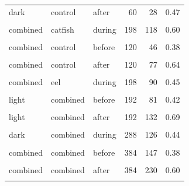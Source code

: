 \documentclass[
  12pt,
  a4paper,
  oneside]{scrbook}
\begin{document}
\begin{longtable}[t]{lllrrr}
dark & control & after & 60 & 28 & 0.47\\
\cellcolor{gray!8}{combined} & \cellcolor{gray!8}{catfish} & \cellcolor{gray!8}{before} & \cellcolor{gray!8}{132} & \cellcolor{gray!8}{60} & \cellcolor{gray!8}{0.45}\\
combined & catfish & during & 198 & 118 & 0.60\\
\addlinespace
\cellcolor{gray!8}{combined} & \cellcolor{gray!8}{catfish} & \cellcolor{gray!8}{after} & \cellcolor{gray!8}{132} & \cellcolor{gray!8}{94} & \cellcolor{gray!8}{0.71}\\
combined & control & before & 120 & 46 & 0.38\\
\cellcolor{gray!8}{combined} & \cellcolor{gray!8}{control} & \cellcolor{gray!8}{during} & \cellcolor{gray!8}{180} & \cellcolor{gray!8}{86} & \cellcolor{gray!8}{0.48}\\
combined & control & after & 120 & 77 & 0.64\\
\cellcolor{gray!8}{combined} & \cellcolor{gray!8}{eel} & \cellcolor{gray!8}{before} & \cellcolor{gray!8}{132} & \cellcolor{gray!8}{41} & \cellcolor{gray!8}{0.31}\\
\addlinespace
combined & eel & during & 198 & 90 & 0.45\\
\cellcolor{gray!8}{combined} & \cellcolor{gray!8}{eel} & \cellcolor{gray!8}{after} & \cellcolor{gray!8}{132} & \cellcolor{gray!8}{59} & \cellcolor{gray!8}{0.45}\\
light & combined & before & 192 & 81 & 0.42\\
\cellcolor{gray!8}{light} & \cellcolor{gray!8}{combined} & \cellcolor{gray!8}{during} & \cellcolor{gray!8}{288} & \cellcolor{gray!8}{168} & \cellcolor{gray!8}{0.58}\\
light & combined & after & 192 & 132 & 0.69\\
\addlinespace
\cellcolor{gray!8}{dark} & \cellcolor{gray!8}{combined} & \cellcolor{gray!8}{before} & \cellcolor{gray!8}{192} & \cellcolor{gray!8}{66} & \cellcolor{gray!8}{0.34}\\
dark & combined & during & 288 & 126 & 0.44\\
\cellcolor{gray!8}{dark} & \cellcolor{gray!8}{combined} & \cellcolor{gray!8}{after} & \cellcolor{gray!8}{192} & \cellcolor{gray!8}{98} & \cellcolor{gray!8}{0.51}\\
combined & combined & before & 384 & 147 & 0.38\\
\cellcolor{gray!8}{combined} & \cellcolor{gray!8}{combined} & \cellcolor{gray!8}{during} & \cellcolor{gray!8}{576} & \cellcolor{gray!8}{294} & \cellcolor{gray!8}{0.51}\\
\addlinespace
combined & combined & after & 384 & 230 & 0.60\\
\cellcolor{gray!8}{combined} & \cellcolor{gray!8}{combined} & \cellcolor{gray!8}{combined} & \cellcolor{gray!8}{1344} & \cellcolor{gray!8}{671} & \cellcolor{gray!8}{0.50}\\
\bottomrule

\end{longtable}
\end{document}
